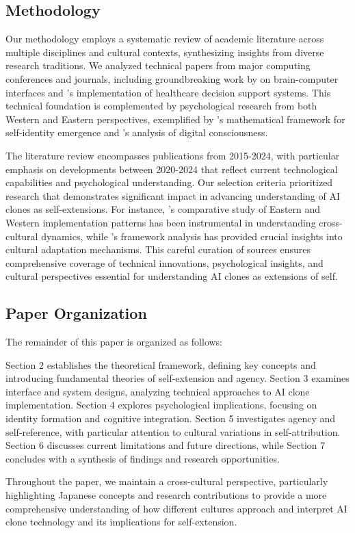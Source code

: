 \subsection{Methodology}

Our methodology employs a systematic review of academic literature across multiple disciplines and cultural contexts, synthesizing insights from diverse research traditions. We analyzed technical papers from major computing conferences and journals, including groundbreaking work by \citet{shang2024biologically} on brain-computer interfaces and \citet{kim2024healthcare}'s implementation of healthcare decision support systems. This technical foundation is complemented by psychological research from both Western and Eastern perspectives, exemplified by \citet{lee2024self}'s mathematical framework for self-identity emergence and \citet{veliev2024digital}'s analysis of digital consciousness.

The literature review encompasses publications from 2015-2024, with particular emphasis on developments between 2020-2024 that reflect current technological capabilities and psychological understanding. Our selection criteria prioritized research that demonstrates significant impact in advancing understanding of AI clones as self-extensions. For instance, \citet{liu2024cultural}'s comparative study of Eastern and Western implementation patterns has been instrumental in understanding cross-cultural dynamics, while \citet{zhang2023cultural}'s framework analysis has provided crucial insights into cultural adaptation mechanisms. This careful curation of sources ensures comprehensive coverage of technical innovations, psychological insights, and cultural perspectives essential for understanding AI clones as extensions of self.

\subsection{Paper Organization}

The remainder of this paper is organized as follows:

Section 2 establishes the theoretical framework, defining key concepts and introducing fundamental theories of self-extension and agency. Section 3 examines interface and system designs, analyzing technical approaches to AI clone implementation. Section 4 explores psychological implications, focusing on identity formation and cognitive integration. Section 5 investigates agency and self-reference, with particular attention to cultural variations in self-attribution. Section 6 discusses current limitations and future directions, while Section 7 concludes with a synthesis of findings and research opportunities.

Throughout the paper, we maintain a cross-cultural perspective, particularly highlighting Japanese concepts and research contributions to provide a more comprehensive understanding of how different cultures approach and interpret AI clone technology and its implications for self-extension.
